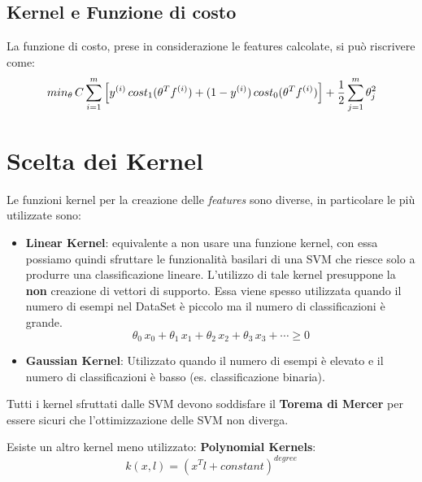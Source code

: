 \subsection{Kernel e Funzione di costo}
La funzione di costo, prese in considerazione le features calcolate, si può riscrivere come:
\[min_\theta \, C \sum_{i=1}^m \left[ y^{(i)}\,cost_1(\theta^T f^{(i)}) + (1-y^{(i)})\,cost_0(\theta^T f^{(i)}) \right] + {1 \over 2 } \sum_{j=1}^m \theta_j^2\]
\section{Scelta dei Kernel}
Le funzioni kernel per la creazione delle \textit{features} sono diverse, in particolare le più utilizzate sono:
\begin{itemize}
    \item \textbf{Linear Kernel}: equivalente a non usare una funzione kernel, con essa possiamo quindi sfruttare le funzionalità basilari di una SVM che riesce solo a produrre una classificazione lineare. L'utilizzo di tale kernel presuppone la \textbf{non} creazione di vettori di supporto. Essa viene spesso utilizzata quando il numero di esempi nel DataSet è piccolo ma il numero di classificazioni è grande.
    \[\theta_0\,x_0 + \theta_1\,x_1 + \theta_2\,x_2 + \theta_3\,x_3 + \cdots \geq 0\]
    \item \textbf{Gaussian Kernel}: Utilizzato quando il numero di esempi è elevato e il numero di classificazioni è basso (es. classificazione binaria).
\end{itemize}
\begin{definizione}
  Tutti i kernel sfruttati dalle SVM devono soddisfare il \textbf{Torema di Mercer} per essere sicuri che l'ottimizzazione delle SVM non diverga.
\end{definizione}
\begin{nota}

Esiste un altro kernel meno utilizzato: \textbf{Polynomial Kernels}:
\[k(x, l) = (x^T l + constant)^{degree}\]
\end{nota}
